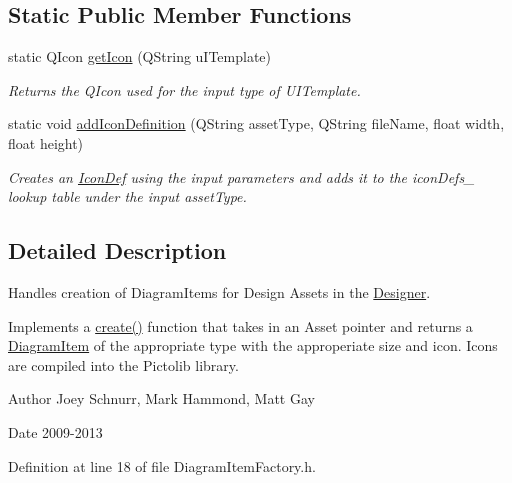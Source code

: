 \subsection*{Static Public Member Functions}
\begin{DoxyCompactItemize}
\item 
\hypertarget{class_diagram_item_factory_a7b6a61f0a16682a7c8d544f9714eb433}{static Q\-Icon \hyperlink{class_diagram_item_factory_a7b6a61f0a16682a7c8d544f9714eb433}{get\-Icon} (Q\-String u\-I\-Template)}\label{class_diagram_item_factory_a7b6a61f0a16682a7c8d544f9714eb433}

\begin{DoxyCompactList}\small\item\em Returns the Q\-Icon used for the input type of U\-I\-Template. \end{DoxyCompactList}\item 
static void \hyperlink{class_diagram_item_factory_a734298bc1d8a79757c6ee7418d961f73}{add\-Icon\-Definition} (Q\-String asset\-Type, Q\-String file\-Name, float width, float height)
\begin{DoxyCompactList}\small\item\em Creates an \hyperlink{struct_icon_def}{Icon\-Def} using the input parameters and adds it to the icon\-Defs\-\_\- lookup table under the input asset\-Type. \end{DoxyCompactList}\end{DoxyCompactItemize}


\subsection{Detailed Description}
Handles creation of Diagram\-Items for Design Assets in the \hyperlink{class_designer}{Designer}. 

Implements a \hyperlink{class_diagram_item_factory_aa6a698c7bfd5e8099d6aa4f683d66324}{create()} function that takes in an Asset pointer and returns a \hyperlink{class_diagram_item}{Diagram\-Item} of the appropriate type with the approperiate size and icon. Icons are compiled into the Pictolib library. \begin{DoxyAuthor}{Author}
Joey Schnurr, Mark Hammond, Matt Gay 
\end{DoxyAuthor}
\begin{DoxyDate}{Date}
2009-\/2013 
\end{DoxyDate}


Definition at line 18 of file Diagram\-Item\-Factory.\-h.



